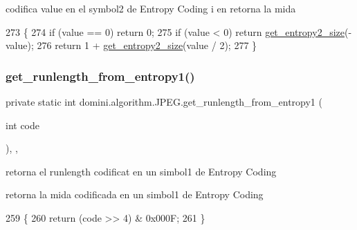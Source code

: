 codifica value en el symbol2 de Entropy Coding i en retorna la mida 


\begin{DoxyCode}
273                                                     \{
274         \textcolor{keywordflow}{if} (value == 0) \textcolor{keywordflow}{return} 0;
275         \textcolor{keywordflow}{if} (value < 0) \textcolor{keywordflow}{return} \hyperlink{classdomini_1_1algorithm_1_1JPEG_aa9bc9bee7181efee254be843e23ee2c6}{get\_entropy2\_size}(-value);
276         \textcolor{keywordflow}{return} 1 + \hyperlink{classdomini_1_1algorithm_1_1JPEG_aa9bc9bee7181efee254be843e23ee2c6}{get\_entropy2\_size}(value / 2);
277     \}
\end{DoxyCode}
\mbox{\label{classdomini_1_1algorithm_1_1JPEG_ac58cb434a7acfd90fc8e548fd7c00ae2}} 
\subsubsection{\texorpdfstring{get\+\_\+runlength\+\_\+from\+\_\+entropy1()}{get\_runlength\_from\_entropy1()}}
{\footnotesize\ttfamily private static int domini.\+algorithm.\+J\+P\+E\+G.\+get\+\_\+runlength\+\_\+from\+\_\+entropy1 (\begin{DoxyParamCaption}\item[{int}]{code }\end{DoxyParamCaption})\hspace{0.3cm}{\ttfamily [inline]}, {\ttfamily [static]}, {\ttfamily [private]}}



retorna el runlength codificat en un simbol1 de Entropy Coding 

retorna la mida codificada en un simbol1 de Entropy Coding 
\begin{DoxyCode}
259                                                              \{
260         \textcolor{keywordflow}{return} (code >> 4) & 0x000F;
261     \}
\end{DoxyCode}
\mbox{\label{classdomini_1_1algorithm_1_1JPEG_a8d1005fb7833d36a064afb1c5e15bbd3}} 
